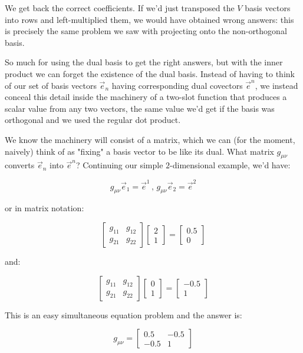 We get back the correct coefficients. If we'd just transposed the $V$ basis vectors into rows and left-multiplied them, we would have obtained wrong answers: this is precisely the same problem we saw with projecting onto the non-orthogonal basis.

So much for using the dual basis to get the right answers, but with the inner product we can forget the existence of the dual basis. Instead of having to think of our set of basis vectors $\vec{e}_n$ having corresponding dual covectors $\vec{e}^n$, we instead conceal this detail inside the machinery of a two-slot function that produces a scalar value from any two vectors, the same value we'd get if the basis was orthogonal and we used the regular dot product.

We know the machinery will consist of a matrix, which we can (for the moment, naively) think of as "fixing" a basis vector to be like its dual. What matrix $g_{\mu\nu}$ converts $\vec{e}_n$ into $\vec{e}^n$? Continuing our simple $2$-dimensional example, we'd have:

$$
g_{\mu\nu} \vec{e}_1 = \vec{e}^1 \,,\, g_{\mu\nu} \vec{e}_2 = \vec{e}^2
$$

or in matrix notation:

$$
\begin{bmatrix}g_{11} & g_{12} \\ g_{21} & g_{22}\end{bmatrix}
\begin{bmatrix}2 \\ 1\end{bmatrix} = 
\begin{bmatrix}0.5 \\ 0\end{bmatrix}
$$

and:

$$
\begin{bmatrix}g_{11} & g_{12} \\ g_{21} & g_{22}\end{bmatrix}
\begin{bmatrix}0 \\ 1\end{bmatrix} = 
\begin{bmatrix}-0.5 \\ 1\end{bmatrix}
$$

This is an easy simultaneous equation problem and the answer is:

$$
g_{\mu\nu} = \begin{bmatrix}0.5 & -0.5 \\ -0.5 & 1\end{bmatrix}
$$

